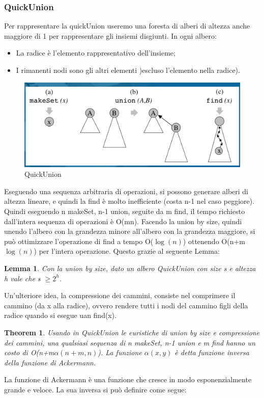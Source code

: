 \documentclass{article}
\newtheorem{theorem}{Theorem}[subsection]
\newtheorem{lemma}{Lemma}[subsection]
\begin{document}
\subsubsection{QuickUnion}
Per rappresentare la quickUnion useremo una foresta di alberi di altezza anche maggiore di 1 per rappresentare gli insiemi disgiunti. In ogni albero:
\begin{itemize}
    \item La radice è l'elemento rappresentativo dell'insieme;
    \item I rimanenti nodi sono gli altri elementi )escluso l'elemento nella radice).
\end{itemize}
\begin{figure}[H]
    \centering
    \includegraphics[width=0.5\linewidth]{quickUnion1.png}
    \caption{QuickUnion}
    \label{fig:enter-label}
\end{figure}
Eseguendo una sequenza arbitraria di operazioni, si possono generare alberi di altezza lineare, e quindi la find è molto inefficiente (costa n-1 nel caso peggiore). Quindi eseguendo n makeSet, n-1 union, seguite da m find, il tempo richiesto dall'intera sequenza di operazioni è O(mn).
Facendo la union by size, quindi unendo l'albero con la grandezza minore all'albero con la grandezza maggiore, si può  ottimizzare l'operazione di find a tempo O($\log(n)$) ottenendo O(n+m$\log(n)$) per l'intera operazione.
Questo grazie al seguente Lemma:
\begin{lemma}
    Con la union by size, dato un albero QuickUnion con size s e altezza h vale che s $\geq 2^h$.
\end{lemma}
Un'ulteriore idea, la compressione dei cammini, consiste nel comprimere il cammino (da x alla radice), ovvero rendere tutti i nodi del cammino figli della radice quando si esegue uan find(x).
\begin{theorem}
    Usando in QuickUnion le euristiche di union by size e compressione dei cammini, una qualsiasi sequenza di n makeSet, n-1 union e m find hanno un costo di O(n+m$\alpha(n+m,n)$). La funzione $\alpha(x,y)$ è detta funzione inversa della funzione di Ackermann.
\end{theorem}
La funzione di Ackermann è una funzione che cresce in modo esponenzialmente grande e veloce. La sua inversa si può definire come segue:
\end{document}
